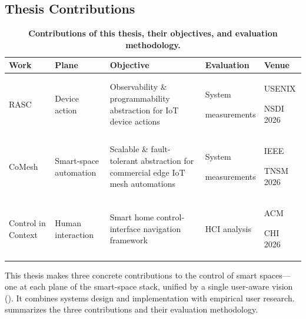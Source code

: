 \subsection{Thesis Contributions}
\label{intro:sec:contributions}



\begin{table}[th!]
    \centering
    \caption{\bf \small Contributions of this thesis, their objectives, and evaluation methodology.}
    \bigskip
    \label{intro:tab:contributions}
    \renewcommand{\arraystretch}{1.3}
    \renewcommand{\tabularxcolumn}[1]{m{#1}}
    \begin{tabularx}{\linewidth}{>{\raggedright\arraybackslash}m{2.3cm}>{\raggedright\arraybackslash}m{2.3cm}X>{\raggedright\arraybackslash}m{2.6cm}>{\raggedright\arraybackslash}m{1.9cm}}
        \hline
        \textbf{Work} & \textbf{Plane} & \textbf{Objective} & \textbf{Evaluation} & \textbf{Venue} \\
        \hline\hline
        RASC~\cite{rasc}
        & Device action
        & {\small Observability \& programmability abstraction for IoT device actions}
        & System\par measurements
        & {\footnotesize USENIX\par NSDI 2026} \\
        \hline
        CoMesh~\cite{comesh}
        & Smart-space automation
        & {\small Scalable \& fault-tolerant abstraction for commercial edge IoT mesh automations}
        & System\par measurements
        & {\footnotesize IEEE\par TNSM 2026} \\
        \hline
        Control in Context~\cite{controlincontext}
        & Human interaction
        & {\small Smart home control-interface navigation framework}
        & HCI analysis
        & {\footnotesize ACM\par CHI 2026} \\
        \hline
    \end{tabularx}
\end{table}

This thesis makes three concrete contributions to the control of smart spaces---one at each plane of the smart-space stack, unified by a single user-aware vision (). It combines systems design and implementation with empirical user research.  summarizes the three contributions and their evaluation methodology.

